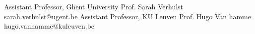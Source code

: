 \documentclass[]{awesome-cv}
\begin{document}
%
%
\begin{refsection}[patents]
    \nocite{*}
    \printbibliography[
    heading=none,
    sorting=ydnt
    ]
\end{refsection}
%
%
\begin{refsection}[journals]
    \nocite{*}
    \printbibliography[
    heading=none,
    sorting=ydnt
    ]
\end{refsection}
%
%
\begin{refsection}[pubs]
    \nocite{*}
    \printbibliography[
    heading=none,
    sorting=ydnt
    ]
\end{refsection}
%
%
\begin{refsection}[arxiv]
    \nocite{*}
    \printbibliography[
    heading=none,
    sorting=ydnt
    ]
\end{refsection}
%
\begin{cventries}
    \cventry
	{Assistant Professor, Ghent University}
	{Prof. Sarah Verhulst}
	{sarah.verhulst@ugent.be}
	{}
	{}
    \cventry
	{Assistant Professor, KU Leuven}
	{Prof. Hugo Van hamme}
	{hugo.vanhamme@kuleuven.be}
	{}
	{}

\end{cventries}
\end{document}
